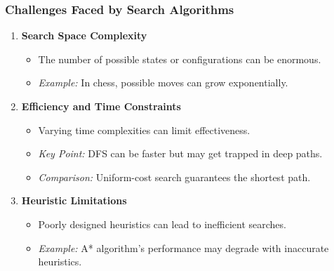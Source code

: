 \documentclass[aspectratio=169]{beamer}
\begin{document}
\begin{frame}[fragile]
    \frametitle{Challenges Faced by Search Algorithms}
    \begin{enumerate}
        \item \textbf{Search Space Complexity}
        \begin{itemize}
            \item The number of possible states or configurations can be enormous.
            \item \textit{Example:} In chess, possible moves can grow exponentially.
        \end{itemize}
        
        \item \textbf{Efficiency and Time Constraints}
        \begin{itemize}
            \item Varying time complexities can limit effectiveness.
            \item \textit{Key Point:} DFS can be faster but may get trapped in deep paths.
            \item \textit{Comparison:} Uniform-cost search guarantees the shortest path.
        \end{itemize}
        
        \item \textbf{Heuristic Limitations}
        \begin{itemize}
            \item Poorly designed heuristics can lead to inefficient searches.
            \item \textit{Example:} A* algorithm's performance may degrade with inaccurate heuristics.
        \end{itemize}
    \end{enumerate}
\end{frame}
\end{document}
